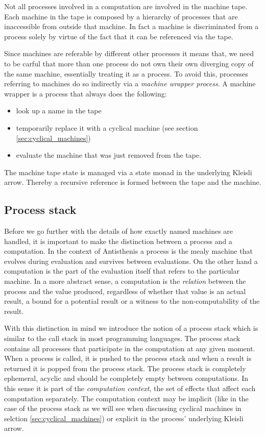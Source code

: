 Not all processes involved in a computation are involved in the
machine tape. Each machine in the tape is composed by a hierarchy of
processes that are inaccessible from outside that machine. In fact a
machine is discriminated from a process solely by virtue of the fact
that it can be referenced via the tape.

Since machines are referable by different other processes it means
that, we need to be carful that more than one process do not own their
own diverging copy of the same machine, essentially treating it as a
process. To avoid this, processes referring to machines do so
indirectly via a \emph{machine wrapper process}. A machine wrapper is
a process that always does the following:

\begin{itemize}
\item look up a name in the tape
\item temporarily replace it with a cyclical machine (see section
  \ref{sec:cyclical_machines})
\item evaluate the machine that was just removed from the tape.
\end{itemize}

The machine tape state is managed via a state monad in the underlying
Kleisli arrow. Thereby a recursive reference is formed between the
tape and the machine.

\subsection{Process stack}
\label{sec:process_stack}

Before we go further with the details of how exactly named machines
are handled, it is important to make the distinction between a process
and a computation. In the context of Antisthenis a process is the
mealy machine that evolves during evaluation and survives between
evaluations. On the other hand a computation is the part of the
evaluation itself that refers to the particular machine. In a more
abstract sense, a computation is the \emph{relation} between the
process and the value produced, regardless of whether that value is an
actual result, a bound for a potential result or a witness to the
non-computability of the result.

With this distinction in mind we introduce the notion of a process
stack which is similar to the call stack in most programming
languages. The process stack contains all processes that participate
in the computation at any given moment. When a process is called, it
is pushed to the process stack and when a result is returned it is
popped from the process stack. The process stack is completely
ephemeral, acyclic and should be completely empty between
computations. In this sense it is part of the \emph{computation
  context}, the set of effects that affect each computation
separately. The computation context may be implicit (like in the case
of the process stack as we will see when discussing cyclical machines
in selction \ref{sec:cyclical_machines}) or explicit in the process'
underlying Kleisli arrow.

